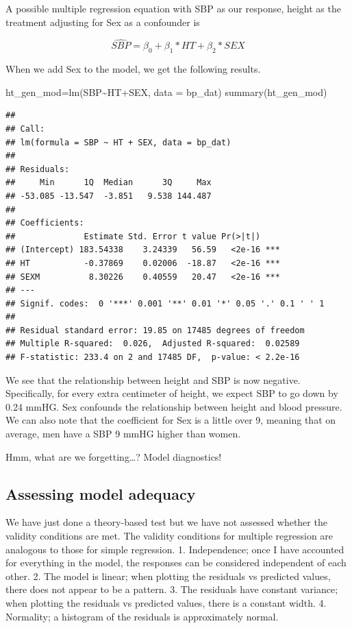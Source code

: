 \documentclass[
]{book}
\newenvironment{Shaded}{\begin{snugshade}}{\end{snugshade}}
\newcommand{\AttributeTok}[1]{\textcolor[rgb]{0.77,0.63,0.00}{#1}}
\newcommand{\FunctionTok}[1]{\textcolor[rgb]{0.00,0.00,0.00}{#1}}
\newcommand{\NormalTok}[1]{#1}
\newcommand{\OtherTok}[1]{\textcolor[rgb]{0.56,0.35,0.01}{#1}}
\newcommand{\SpecialCharTok}[1]{\textcolor[rgb]{0.00,0.00,0.00}{#1}}
\begin{document}
A possible multiple regression equation with SBP as our response, height as the treatment adjusting for Sex as a confounder is

\[\widehat{SBP}=\beta_0+\beta_1*HT+\beta_2*SEX\]

When we add Sex to the model, we get the following results.

\begin{Shaded}
\begin{Highlighting}[]
\NormalTok{ht\_gen\_mod}\OtherTok{=}\FunctionTok{lm}\NormalTok{(SBP}\SpecialCharTok{\textasciitilde{}}\NormalTok{HT}\SpecialCharTok{+}\NormalTok{SEX,}
         \AttributeTok{data =}\NormalTok{ bp\_dat)}
\FunctionTok{summary}\NormalTok{(ht\_gen\_mod)}
\end{Highlighting}
\end{Shaded}

\begin{verbatim}
## 
## Call:
## lm(formula = SBP ~ HT + SEX, data = bp_dat)
## 
## Residuals:
##     Min      1Q  Median      3Q     Max 
## -53.085 -13.547  -3.851   9.538 144.487 
## 
## Coefficients:
##              Estimate Std. Error t value Pr(>|t|)    
## (Intercept) 183.54338    3.24339   56.59   <2e-16 ***
## HT           -0.37869    0.02006  -18.87   <2e-16 ***
## SEXM          8.30226    0.40559   20.47   <2e-16 ***
## ---
## Signif. codes:  0 '***' 0.001 '**' 0.01 '*' 0.05 '.' 0.1 ' ' 1
## 
## Residual standard error: 19.85 on 17485 degrees of freedom
## Multiple R-squared:  0.026,  Adjusted R-squared:  0.02589 
## F-statistic: 233.4 on 2 and 17485 DF,  p-value: < 2.2e-16
\end{verbatim}

We see that the relationship between height and SBP is now negative. Specifically, for every extra centimeter of height, we expect SBP to go down by 0.24 mmHG. Sex confounds the relationship between height and blood pressure. We can also note that the coefficient for Sex is a little over 9, meaning that on average, men have a SBP 9 mmHG higher than women.

Hmm, what are we forgetting\ldots? Model diagnostics!

\hypertarget{assessing-model-adequacy}{%
\subsection{Assessing model adequacy}\label{assessing-model-adequacy}}

We have just done a theory-based test but we have not assessed whether the validity conditions are met. The validity conditions for multiple regression are analogous to those for simple regression.
1. Independence; once I have accounted for everything in the model, the responses can be considered independent of each other.
2. The model is linear; when plotting the residuals vs predicted values, there does not appear to be a pattern.
3. The residuals have constant variance; when plotting the residuals vs predicted values, there is a constant width.
4. Normality; a histogram of the residuals is approximately normal.
\end{document}
